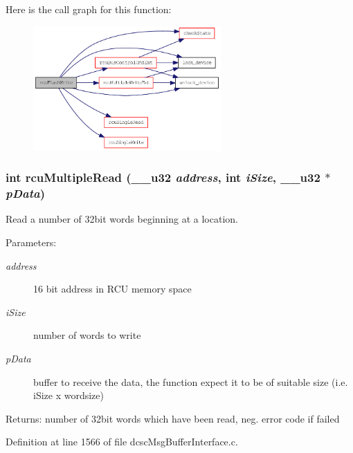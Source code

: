 Here is the call graph for this function:\begin{figure}[H]
\begin{center}
\leavevmode
\includegraphics[width=203pt]{group__dcsc__msg__buffer__access_g88debbd24075d2031add9459e4d90e2b_cgraph}
\end{center}
\end{figure}
\hypertarget{group__dcsc__msg__buffer__access_g602216accce6913989f8b04b36157cd6}{
\subsubsection[rcuMultipleRead]{\setlength{\rightskip}{0pt plus 5cm}int rcu\-Multiple\-Read (\_\-\_\-u32 {\em address}, int {\em i\-Size}, \_\-\_\-u32 $\ast$ {\em p\-Data})}}
\label{group__dcsc__msg__buffer__access_g602216accce6913989f8b04b36157cd6}


Read a number of 32bit words beginning at a location. 

\begin{Desc}
\item[Parameters:]
\begin{description}
\item[{\em address}]16 bit address in RCU memory space \item[{\em i\-Size}]number of words to write \item[{\em p\-Data}]buffer to receive the data, the function expect it to be of suitable size (i.e. i\-Size x wordsize) \end{description}
\end{Desc}
\begin{Desc}
\item[Returns:]number of 32bit words which have been read, neg. error code if failed \end{Desc}


Definition at line 1566 of file dcsc\-Msg\-Buffer\-Interface.c.

